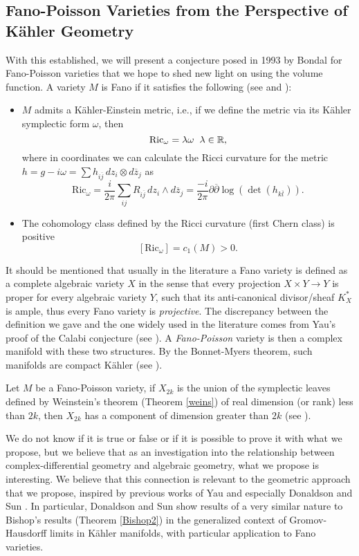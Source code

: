 \documentclass[12pt,twoside,a4paper]{report}
\newcommand{\re}{\ensuremath{\mathbb R }}
\begin{document}
\subsection{Fano-Poisson Varieties from the Perspective of Kähler Geometry}
\noindent With this established, we will present a conjecture posed in 1993 by Bondal for Fano-Poisson varieties that we hope to shed new light on using the volume function. A variety $M$ is Fano if it satisfies the following
(see \cite{S-Yau} and \cite{ZB}):
\begin{itemize}
        \item $M$ admits a Kähler-Einstein metric, i.e., if we define the metric via its Kähler symplectic form
        $\omega$, then
                $$\textrm{Ric}_{\omega}=\lambda\omega\hspace{0.2cm}\lambda\in\re,$$
        where in coordinates we can calculate the Ricci curvature for the metric
        \hbox{$h=g-i\omega=\sum h_{i\overline{j}}\,dz_i\otimes d\overline{z}_j$}
        as
$$\textrm{Ric}_{\omega}=\frac{i}{2\pi}\sum_{ij}R_{i\overline{j}}\,dz_i\wedge d\overline{z}_j=\frac{-i}{2\pi}\partial\overline{\partial}\log(\det(h_{k\overline{l}})).$$
        \item The cohomology class defined by the Ricci curvature (first Chern class) is positive
        $$
        [\textrm{Ric}_{\omega}]=c_1(M)>0.
        $$
\end{itemize}
\noindent It should be mentioned that usually in the literature a Fano variety is defined as a complete algebraic variety $X$
in the sense that every projection $X\times Y\rightarrow Y$ is proper for every algebraic variety $Y$, such that its anti-canonical divisor/sheaf
$K^{*}_{X}$ is ample, thus every Fano variety is \emph{projective}. The discrepancy between the definition we gave and the one widely used in
the literature comes from Yau's proof of the Calabi conjecture (see \cite{S-Yau}). A
\emph{Fano-Poisson} variety is then a complex manifold with these two structures. By the Bonnet-Myers theorem, such manifolds
are compact Kähler (see \cite{Myers}).
\begin{conjecture}[Bondal]\label{Bondal}
  Let $M$ be a Fano-Poisson variety, if $X_{2k}$ is the union of the symplectic leaves defined by Weinstein's theorem (Theorem \ref{weins})
  of real dimension (or rank) less than $2k$, then $X_{2k}$ has a component of dimension greater than $2k$ (see \cite{Bondal}).
\end{conjecture}
\noindent We do not know if it is true or false or if it is possible to prove it with what we propose, but we believe that as an
investigation into the relationship between complex-differential geometry and algebraic geometry, what we propose is interesting.
We believe that this connection is relevant to the geometric approach that we propose, inspired by previous works
of Yau \cite{S-Yau} and especially Donaldson and Sun \cite{D-SS}. In particular, Donaldson and Sun show results of a very similar nature
to Bishop's results (Theorem \ref{Bishop2}) in the generalized context of Gromov-Hausdorff limits in
Kähler manifolds, with particular application to Fano varieties.
\end{document}
